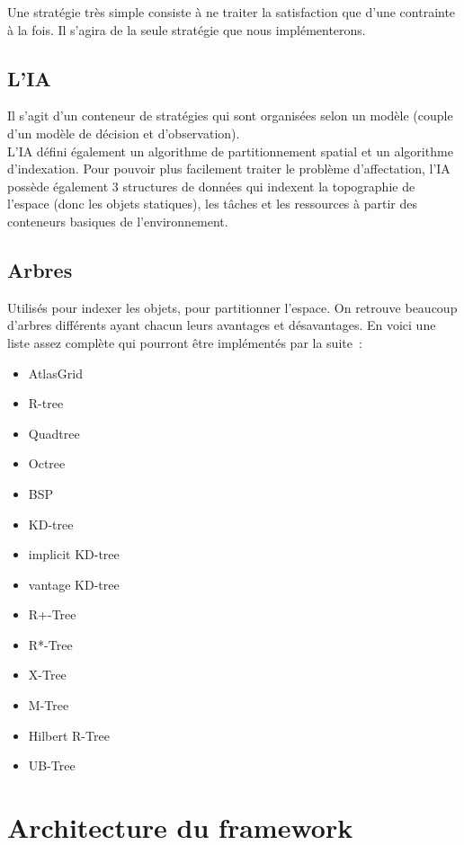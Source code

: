 Une stratégie très simple consiste à ne traiter la satisfaction que d'une contrainte à la fois. Il s'agira de la seule stratégie que nous implémenterons.

\subsection*{L'IA}

Il s'agit d'un conteneur de stratégies qui sont organisées selon un modèle (couple d'un modèle de décision et d'observation).\\
\indent L'IA défini également un algorithme de partitionnement spatial et un algorithme d'indexation.
Pour pouvoir plus facilement traiter le problème d'affectation, l'IA possède également 3 structures de données qui indexent la topographie de l'espace (donc les objets statiques), les tâches et les ressources à partir des conteneurs basiques de l'environnement.

\subsection*{Arbres}

Utilisés pour indexer les objets, pour partitionner l'espace. On retrouve beaucoup d'arbres différents ayant chacun leurs avantages et désavantages. En voici une liste assez complète qui pourront être implémentés par la suite~:
\begin{itemize}
\item AtlasGrid
\item R-tree
\item Quadtree
\item Octree
\item BSP
\item KD-tree
\item implicit KD-tree
\item vantage KD-tree
\item R+-Tree
\item R*-Tree
\item X-Tree
\item M-Tree
\item Hilbert R-Tree
\item UB-Tree
\end{itemize}

\section{Architecture du framework}

